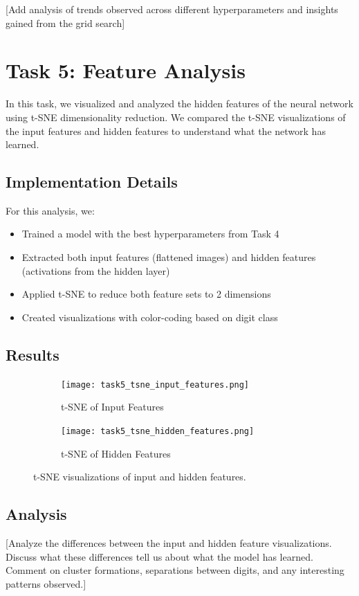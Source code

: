 \documentclass[12pt]{article}
\begin{document}
[Add analysis of trends observed across different hyperparameters and insights gained from the grid search]

\section{Task 5: Feature Analysis}

In this task, we visualized and analyzed the hidden features of the neural network using t-SNE dimensionality reduction. We compared the t-SNE visualizations of the input features and hidden features to understand what the network has learned.

\subsection{Implementation Details}
For this analysis, we:
\begin{itemize}
    \item Trained a model with the best hyperparameters from Task 4
    \item Extracted both input features (flattened images) and hidden features (activations from the hidden layer)
    \item Applied t-SNE to reduce both feature sets to 2 dimensions
    \item Created visualizations with color-coding based on digit class
\end{itemize}

\subsection{Results}

\begin{figure}[H]
    \centering
    \begin{subfigure}{0.48\textwidth}
        \texttt{[image: task5\_tsne\_input\_features.png]}
        \caption{t-SNE of Input Features}
    \end{subfigure}
    \hfill
    \begin{subfigure}{0.48\textwidth}
        \texttt{[image: task5\_tsne\_hidden\_features.png]}
        \caption{t-SNE of Hidden Features}
    \end{subfigure}
    \caption{t-SNE visualizations of input and hidden features.}
    \label{fig:tsne}
\end{figure}

\subsection{Analysis}
[Analyze the differences between the input and hidden feature visualizations. Discuss what these differences tell us about what the model has learned. Comment on cluster formations, separations between digits, and any interesting patterns observed.]
\end{document}
